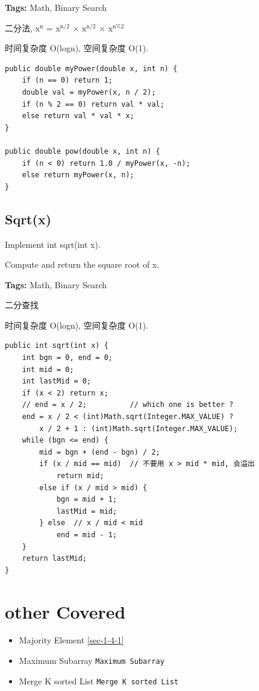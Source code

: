 \documentclass[12pt]{book}
\begin{document}
\textbf{Tags:} Math, Binary Search

二分法, x$^{\text{n}}$ = x$^{\text{n/2}}$ × x$^{\text{n/2}}$ × x$^{\text{n\%2}}$

时间复杂度 O(logn), 空间复杂度 O(1).
\lstset{language=java,label= ,caption= ,numbers=none}
\begin{lstlisting}
public double myPower(double x, int n) {
    if (n == 0) return 1;
    double val = myPower(x, n / 2);
    if (n % 2 == 0) return val * val;
    else return val * val * x;
}

public double pow(double x, int n) {
    if (n < 0) return 1.0 / myPower(x, -n);
    else return myPower(x, n);
}
\end{lstlisting}

\subsection{Sqrt(x)}
\label{sec-12-1-2}
Implement int sqrt(int x).

Compute and return the square root of x.

\textbf{Tags:} Math, Binary Search

二分查找

时间复杂度 O(logn), 空间复杂度 O(1).
\lstset{language=java,label= ,caption= ,numbers=none}
\begin{lstlisting}
public int sqrt(int x) {
    int bgn = 0, end = 0;
    int mid = 0;
    int lastMid = 0;
    if (x < 2) return x;
    // end = x / 2;          // which one is better ?
    end = x / 2 < (int)Math.sqrt(Integer.MAX_VALUE) ?
        x / 2 + 1 : (int)Math.sqrt(Integer.MAX_VALUE);
    while (bgn <= end) {
        mid = bgn + (end - bgn) / 2;
        if (x / mid == mid)  // 不要用 x > mid * mid, 会溢出
            return mid;
        else if (x / mid > mid) {
            bgn = mid + 1;
            lastMid = mid;
        } else  // x / mid < mid
            end = mid - 1;
    }
    return lastMid;
}
\end{lstlisting}

\section{other Covered}
\label{sec-12-2}
\begin{itemize}
\item Majority Element
\ref{sec-1-4-1}
\item Maximum Subarray
\texttt{Maximum Subarray}
\item Merge K sorted List
\texttt{Merge K sorted List}
\end{itemize}
\end{document}
